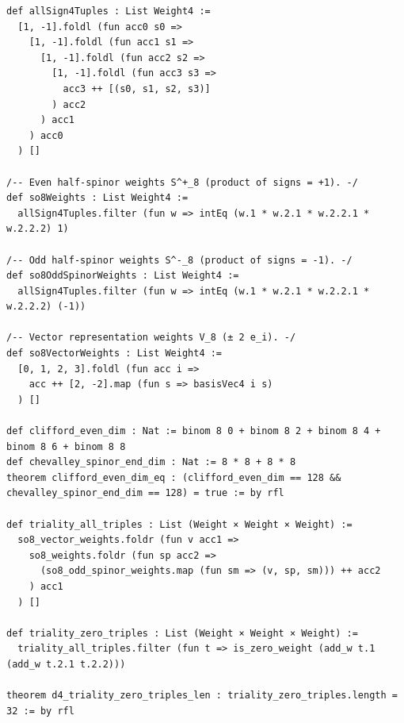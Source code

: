 \documentclass[11pt,a4paper]{article}
\begin{document}
\begin{lstlisting}[caption={Constructive $\operatorname{Spin}(8)$ weight spaces in \texttt{ShiodaFormalConjectures.lean} and triality triples in \texttt{HodgeVerification.lean}.}]
def allSign4Tuples : List Weight4 :=
  [1, -1].foldl (fun acc0 s0 =>
    [1, -1].foldl (fun acc1 s1 =>
      [1, -1].foldl (fun acc2 s2 =>
        [1, -1].foldl (fun acc3 s3 =>
          acc3 ++ [(s0, s1, s2, s3)]
        ) acc2
      ) acc1
    ) acc0
  ) []

/-- Even half-spinor weights S^+_8 (product of signs = +1). -/
def so8Weights : List Weight4 :=
  allSign4Tuples.filter (fun w => intEq (w.1 * w.2.1 * w.2.2.1 * w.2.2.2) 1)

/-- Odd half-spinor weights S^-_8 (product of signs = -1). -/
def so8OddSpinorWeights : List Weight4 :=
  allSign4Tuples.filter (fun w => intEq (w.1 * w.2.1 * w.2.2.1 * w.2.2.2) (-1))

/-- Vector representation weights V_8 (± 2 e_i). -/
def so8VectorWeights : List Weight4 :=
  [0, 1, 2, 3].foldl (fun acc i =>
    acc ++ [2, -2].map (fun s => basisVec4 i s)
  ) []

def clifford_even_dim : Nat := binom 8 0 + binom 8 2 + binom 8 4 + binom 8 6 + binom 8 8
def chevalley_spinor_end_dim : Nat := 8 * 8 + 8 * 8
theorem clifford_even_dim_eq : (clifford_even_dim == 128 && chevalley_spinor_end_dim == 128) = true := by rfl

def triality_all_triples : List (Weight × Weight × Weight) :=
  so8_vector_weights.foldr (fun v acc1 =>
    so8_weights.foldr (fun sp acc2 =>
      (so8_odd_spinor_weights.map (fun sm => (v, sp, sm))) ++ acc2
    ) acc1
  ) []

def triality_zero_triples : List (Weight × Weight × Weight) :=
  triality_all_triples.filter (fun t => is_zero_weight (add_w t.1 (add_w t.2.1 t.2.2)))

theorem d4_triality_zero_triples_len : triality_zero_triples.length = 32 := by rfl
\end{lstlisting}
\end{document}
